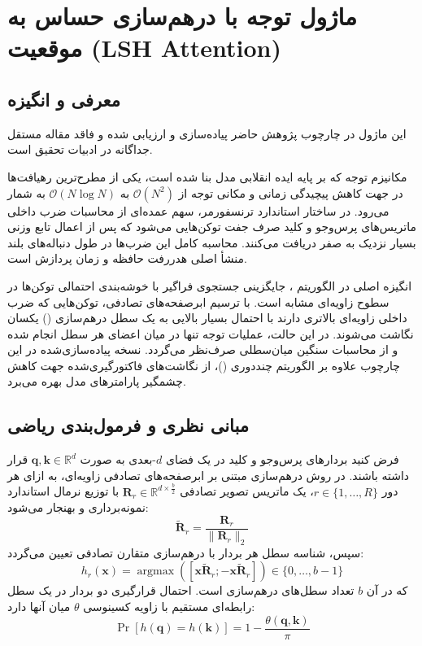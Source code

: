 \section{ماژول توجه با درهم‌سازی حساس به موقعیت (LSH Attention)}
\label{sec:module_lsh_attention}

\subsection{معرفی و انگیزه}
این ماژول در چارچوب پژوهش حاضر پیاده‌سازی و ارزیابی شده و فاقد مقاله مستقل جداگانه در ادبیات تحقیق است.

مکانیزم توجه  که بر پایه ایده انقلابی مدل  بنا شده است، یکی از مطرح‌ترین رهیافت‌ها در جهت کاهش پیچیدگی زمانی و مکانی توجه از $\mathcal{O}(N^2)$ به $\mathcal{O}(N \log N)$ به شمار می‌رود. در ساختار استاندارد ترنسفورمر، سهم عمده‌ای از محاسبات ضرب داخلی ماتریس‌های پرس‌وجو و کلید صرف جفت توکن‌هایی می‌شود که پس از اعمال تابع  وزنی بسیار نزدیک به صفر دریافت می‌کنند. محاسبه کامل این ضرب‌ها در طول دنباله‌های بلند منشأ اصلی هدررفت حافظه و زمان پردازش است.

انگیزه اصلی در الگوریتم ، جایگزینی جستجوی فراگیر با خوشه‌بندی احتمالی توکن‌ها در سطوح زاویه‌ای مشابه است. با ترسیم ابرصفحه‌های تصادفی، توکن‌هایی که ضرب داخلی زاویه‌ای بالاتری دارند با احتمال بسیار بالایی به یک سطل درهم‌سازی () یکسان نگاشت می‌شوند. در این حالت، عملیات توجه تنها در میان اعضای هر سطل انجام شده و از محاسبات سنگین میان‌سطلی صرف‌نظر می‌گردد. نسخه پیاده‌سازی‌شده در این چارچوب علاوه بر الگوریتم چنددوری ()، از نگاشت‌های فاکتورگیری‌شده  جهت کاهش چشمگیر پارامترهای مدل بهره می‌برد.

\subsection{مبانی نظری و فرمول‌بندی ریاضی}
فرض کنید بردارهای پرس‌وجو و کلید در یک فضای $d$-بعدی به صورت $\mathbf{q}, \mathbf{k} \in \mathbb{R}^d$ قرار داشته باشند. در روش درهم‌سازی مبتنی بر ابرصفحه‌های تصادفی زاویه‌ای، به ازای هر دور $r \in \{1, \dots, R\}$، یک ماتریس تصویر تصادفی $\mathbf{R}_r \in \mathbb{R}^{d \times \frac{b}{2}}$ با توزیع نرمال استاندارد نمونه‌برداری و بهنجار می‌شود:
\begin{equation}
\tilde{\mathbf{R}}_r = \frac{\mathbf{R}_r}{\|\mathbf{R}_r\|_2}
\end{equation}
سپس، شناسه سطل هر بردار با درهم‌سازی متقارن تصادفی تعیین می‌گردد:
\begin{equation}
h_r(\mathbf{x}) = \operatorname{argmax}\left( [\mathbf{x} \tilde{\mathbf{R}}_r ; -\mathbf{x} \tilde{\mathbf{R}}_r] \right) \in \{0, \dots, b - 1\}
\end{equation}
که در آن $b$ تعداد سطل‌های درهم‌سازی است. احتمال قرارگیری دو بردار در یک سطل رابطه‌ای مستقیم با زاویه کسینوسی $\theta$ میان آنها دارد:
\begin{equation}
\Pr[h(\mathbf{q}) = h(\mathbf{k})] = 1 - \frac{\theta(\mathbf{q}, \mathbf{k})}{\pi}
\end{equation}

